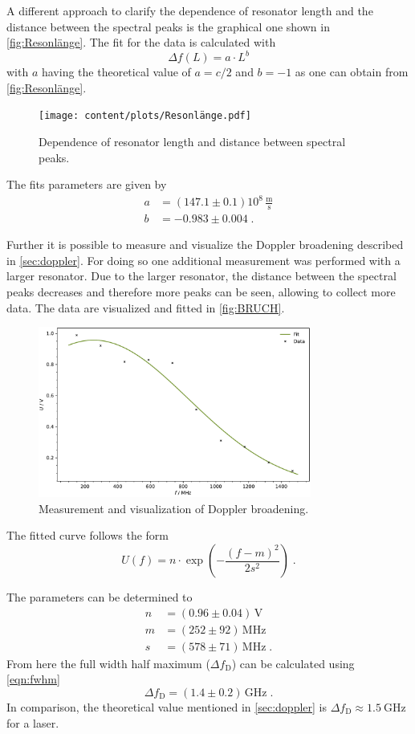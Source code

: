 A different approach to clarify the dependence of resonator length and the distance between the spectral peaks is the graphical one shown in \autoref{fig:Resonlänge}. The fit for the data is calculated with 
\begin{equation*}
    \Delta f(L)=a\cdot L^{b}
\end{equation*}
with $a$ having the theoretical value of $a=c/2$ and $b=-1$ as one can obtain from \autoref{fig:Resonlänge}.
\begin{figure}[h!]
    \centering
    \texttt{[image: content/plots/Resonlänge.pdf]}
    \caption{Dependence of resonator length and distance between spectral peaks.}
    \label{fig:Resonlänge}
\end{figure}
The fits parameters are given by 
\begin{align*}
    a&= (147.1 \pm 0.1) 10^8\, \frac{\text{m}}{\text{s}} \\
    b&= -0.983 \pm 0.004\; .
\end{align*}

Further it is possible to measure and visualize the Doppler broadening described in \autoref{sec:doppler}. For doing so one additional measurement was performed with a larger resonator. Due to the larger resonator, the distance between the spectral peaks decreases and therefore more peaks can be seen, allowing to collect more data. The data are visualized and fitted in \autoref{fig:BRUCH}.
\begin{figure}[h!]
    \centering
    \includegraphics[width=0.8\textwidth]{content/plots/AUA.pdf}
    \caption{Measurement and visualization of Doppler broadening.}
    \label{fig:BRUCH}
\end{figure}
The fitted curve follows the form 
\begin{equation*}
    U(f)= n\cdot \exp\left(-\frac{(f-m)^2}{2s^2}\right)\; .
\end{equation*}

The parameters can be determined to
\begin{align*}
    n &= (0.96 \pm 0.04)\, \text{V} \\
    m &= (252 \pm 92) \, \text{MHz} \\
    s &= (578 \pm 71) \, \text{MHz}\; .
\end{align*}
From here the full width half maximum ($\Delta f_{\text{D}}$) can be calculated using \autoref{eqn:fwhm}
\begin{equation*}
    \Delta f_{\text{D}} = (1.4 \pm 0.2) \, \text{GHz}\; . 
\end{equation*}
In comparison, the theoretical value mentioned in \autoref{sec:doppler} is $\Delta f_\text{D} \approx \qty{1.5}{\giga\hertz}$ for a \HeNe laser.

